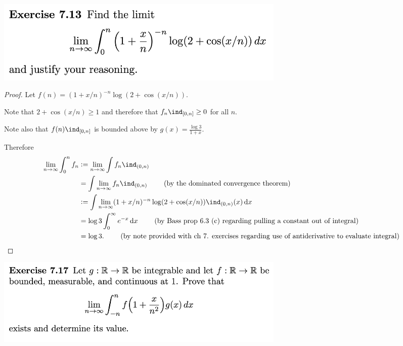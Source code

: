\newpage
\begin{mdframed}
\includegraphics[width=400pt]{img/analysis--berkeley-202a-hw08-9931.png}
\end{mdframed}

\begin{proof}
  Let $f(n) = (1 + x/n)^{-n} \log(2 + \cos(x/n))$.

  Note that $2 + \cos(x/n) \geq 1$ and therefore that $f_n\ind_{[0, n]} \geq 0$ for all $n$.

  Note also that $f(n)\ind_{[0, n]}$ is bounded above by $g(x) = \frac{\log 3}{1 + x}$.

  Therefore
  \begin{align*}
    \limn \int_0^n f_n
    &:=\limn \int f_n\ind_{(0, n)}                                        \\
    &= \int \limn f_n\ind_{(0, n)}                                        ~~~~~~~ \text{(by the dominated convergence theorem)}\\
    &:= \int \limn (1 + x/n)^{-n} \log(2 + \cos(x/n))\ind_{(0, n)}(x)\dx  \\
    &= \log 3\int_0^\infty e^{-x} \dx                                     ~~~~~~~ \text{(by Bass prop 6.3 (c) regarding pulling a constant out of integral})\\
    &= \log 3.                                                           ~~~~~~~  \text{(by note provided with ch 7. exercises regarding use of antiderivative to evaluate integral)}
  \end{align*}

\end{proof}

\newpage
\begin{mdframed}
\includegraphics[width=400pt]{img/analysis--berkeley-202a-hw08-6e60.png}
\end{mdframed}

